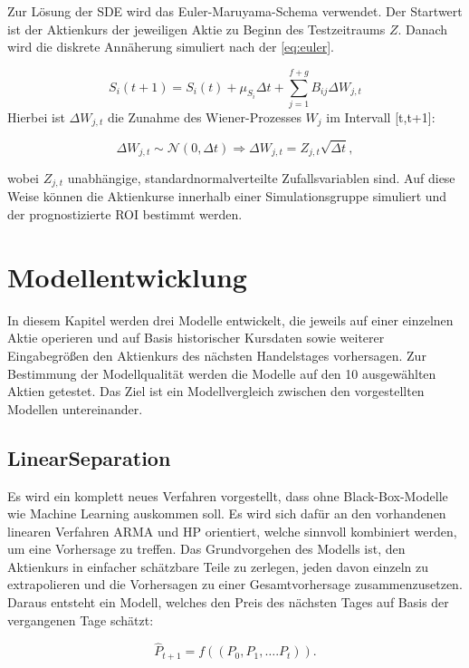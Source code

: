 Zur Lösung der \ac{SDE} wird das Euler-Maruyama-Schema verwendet. Der Startwert ist der Aktienkurs der jeweiligen Aktie zu Beginn des Testzeitraums $Z$. Danach wird die diskrete Annäherung simuliert nach der \cref{eq:euler}.

\begin{equation}\label{eq:euler}
    S_i(t+1) = S_i(t) + \mu_{S_i} \Delta t + \sum_{j=1}^{f+g}B_{ij} \Delta W_{j,t}
\end{equation}
Hierbei ist $\Delta W_{j,t}$ die Zunahme des Wiener-Prozesses $W_j$ im Intervall [t,t+1]:

\[
    \Delta W_{j,t} \sim \mathcal{N} (0, \Delta t) \Longrightarrow \Delta W_{j,t} = Z_{j, t} \sqrt{\Delta t},
\]

wobei $Z_{j,t}$ unabhängige, standardnormalverteilte Zufallsvariablen sind.
Auf diese Weise können die Aktienkurse innerhalb einer Simulationsgruppe simuliert und der prognostizierte \ac{ROI} bestimmt werden.

\section{Modellentwicklung}\label{sec:entwicklung}

In diesem Kapitel werden drei Modelle entwickelt, die jeweils auf einer einzelnen Aktie operieren und auf Basis historischer Kursdaten sowie weiterer Eingabegrößen den Aktienkurs des nächsten Handelstages vorhersagen. Zur Bestimmung der Modellqualität werden die Modelle auf den 10 ausgewählten Aktien getestet. Das Ziel ist ein Modellvergleich zwischen den vorgestellten Modellen untereinander.

\subsection{LinearSeparation}\label{subsec:linearesModell}

Es wird ein komplett neues Verfahren vorgestellt, dass ohne Black-Box-Modelle wie Machine Learning auskommen soll. Es wird sich dafür an den vorhandenen linearen Verfahren \ac{ARMA} und \ac{HP} orientiert, welche sinnvoll kombiniert werden, um eine Vorhersage zu treffen. Das Grundvorgehen des Modells ist, den Aktienkurs in einfacher schätzbare Teile zu zerlegen, jeden davon einzeln zu extrapolieren und die Vorhersagen zu einer Gesamtvorhersage zusammenzusetzen. Daraus entsteht ein Modell, welches den Preis des nächsten Tages auf Basis der vergangenen Tage schätzt:

\[
    \hat{P}_{t+1} = f((P_0, P_1, \dots. P_t)).
\]

